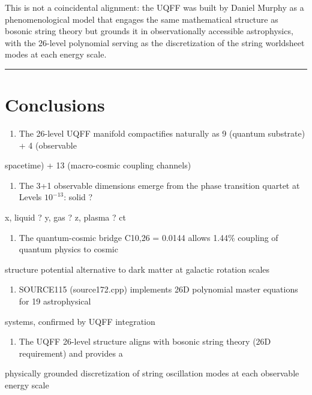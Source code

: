 \documentclass[12pt,a4paper]{article}
\begin{document}
This is not a coincidental alignment: the UQFF was built by Daniel Murphy as a phenomenological model that engages the same mathematical structure as bosonic string theory but grounds it in observationally accessible astrophysics, with the 26-level polynomial serving as the discretization of the string worldsheet modes at each energy scale.

\medskip\hrule\medskip

\section{Conclusions}

\begin{enumerate}
  \item The 26-level UQFF manifold compactifies naturally as 9 (quantum substrate) + 4 (observable
\end{enumerate}

spacetime) + 13 (macro-cosmic coupling channels)

\begin{enumerate}
  \item The 3+1 observable dimensions emerge from the phase transition quartet at Levels $10^{-13}$: solid ?
\end{enumerate}

x, liquid ? y, gas ? z, plasma ? ct

\begin{enumerate}
  \item The quantum-cosmic bridge C10,26 = 0.0144 allows 1.44\% coupling of quantum physics to cosmic
\end{enumerate}

structure  potential alternative to dark matter at galactic rotation scales

\begin{enumerate}
  \item SOURCE115 (source172.cpp) implements 26D polynomial master equations for 19 astrophysical
\end{enumerate}

systems, confirmed by UQFF integration

\begin{enumerate}
  \item The UQFF 26-level structure aligns with bosonic string theory (26D requirement) and provides a
\end{enumerate}

physically grounded discretization of string oscillation modes at each observable energy scale
\end{document}
